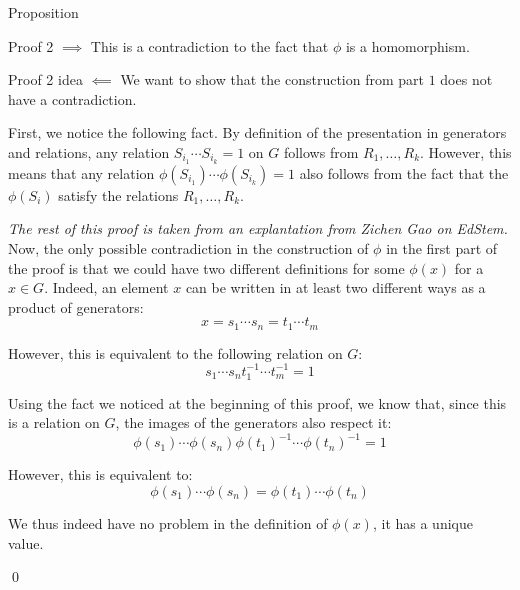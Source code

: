 \documentclass[a4paper]{article}
\begin{document}
\begin{parag}{Proposition}
\begin{subparag}{Proof 2 $\implies$}
        This is a contradiction to the fact that $\phi$ is a homomorphism.
    \end{subparag}

    \begin{subparag}{Proof 2 idea $\impliedby$}
        We want to show that the construction from part $1$ does not have a contradiction.

        First, we notice the following fact. By definition of the presentation in generators and relations, any relation $S_{i_1} \cdots S_{i_k} = 1$ on $G$ follows from $R_1, \ldots, R_k$. However, this means that any relation $\phi\left(S_{i_1}\right) \cdots \phi\left(S_{i_k}\right) = 1$ also follows from the fact that the $\phi\left(S_i\right)$ satisfy the relations $R_1, \ldots, R_k$.

        \textit{The rest of this proof is taken from an explantation from Zichen Gao on EdStem.} Now, the only possible contradiction in the construction of $\phi$ in the first part of the proof is that we could have two different definitions for some $\phi\left(x\right)$ for a $x \in G$. Indeed, an element $x$ can be written in at least two different ways as a product of generators: 
        \[x = s_1 \cdots s_n = t_1 \cdots t_m\]
        
        However, this is equivalent to the following relation on $G$: 
        \[s_1 \cdots s_n t_1^{-1} \cdots t_m^{-1} = 1\]
        
        Using the fact we noticed at the beginning of this proof, we know that, since this is a relation on $G$, the images of the generators also respect it: 
        \[\phi\left(s_1\right) \cdots \phi\left(s_n\right) \phi\left(t_1\right)^{-1} \cdots \phi\left(t_n\right)^{-1} = 1\]
        
        However, this is equivalent to: 
        \[\phi\left(s_1\right) \cdots \phi\left(s_n\right) = \phi\left(t_1\right) \cdots \phi\left(t_n\right)\]
        
        We thus indeed have no problem in the definition of $\phi\left(x\right)$, it has a unique value.

        \qed
    \end{subparag}
\end{parag}
\end{document}
